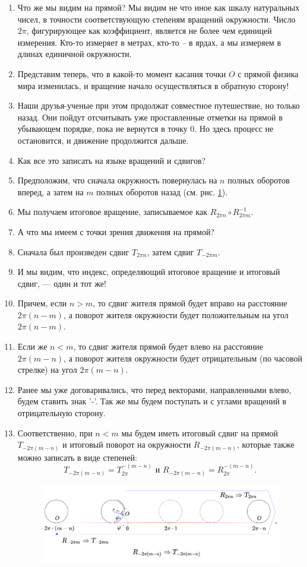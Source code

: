 \begin{enumerate}
\item Что же мы видим на прямой? Мы видим не что иное как шкалу натуральных чисел, в точности соответствующую степеням вращений окружности. Число $2\pi$, фигурирующее как коэффициент, является не более чем единицей измерения. Кто-то измеряет в метрах, кто-то -- в ярдах, а мы измеряем в длинах единичной окружности.
\item Представим теперь, что в какой-то момент касания точки $O$ с прямой физика мира изменилась, и вращение начало осуществляться в обратную сторону!
\item Наши друзья-ученые при этом продолжат совместное путешествие, но только назад. Они пойдут отсчитывать уже проставленные отметки на прямой в убывающем порядке, пока не вернутся в точку 0. Но здесь процесс не остановится, и движение продолжится дальше.
\item Как все это записать на языке вращений и сдвигов?
\item Предположим, что сначала окружность повернулась на $n$ полных оборотов вперед, а затем на $m$ полных оборотов назад (см. рис. \ref{RundLine1}).
\item Мы получаем итоговое вращение, записываемое как $R_{2\pi n}\circ R_{2\pi m}^{-1}$.
\item А что мы имеем с точки зрения движения на прямой?
\item Сначала был произведен сдвиг $T_{2\pi n}$, затем сдвиг $T_{-2\pi m}$.
\item И мы видим, что индекс, определяющий итоговое вращение и итоговый сдвиг, --- один и тот же!
\item Причем, если $n>m$, то сдвиг жителя прямой будет вправо на расстояние $2\pi(n-m)$, а поворот жителя окружности будет положительным на угол $2\pi(n-m)$.
\item Если же $n<m$, то сдвиг жителя прямой будет влево на расстояние $2\pi(m-n)$, а поворот жителя окружности будет отрицательным (по часовой стрелке) на угол $2\pi(m-n)$.
\item Ранее мы уже договаривались, что перед векторами, направленными влево, будем ставить знак '-'. Так же мы будем поступать и с углами вращений в отрицательную сторону.
\item Соответственно, при $n<m$ мы будем иметь итоговый сдвиг на прямой $T_{-2\pi(m-n)}$ и итоговый поворот на окружности $R_{-2\pi(m-n)}$, которые также можно записать в виде степеней:
$$
T_{-2\pi(m-n)}=T_{2\pi}^{-(m-n)}\mbox{ и }R_{-2\pi(m-n)}=R_{2\pi}^{-(m-n)}.
$$

\begin{figure}[hbt!]
\begin{center}
\includegraphics[scale=0.15]{RundLine1.png}
\end{center}
\caption{}\label{RundLine1}
\end{figure}


\end{enumerate}
